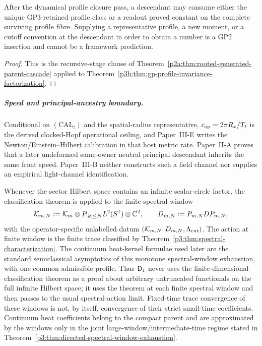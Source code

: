 \documentclass[12pt,a4paper]{article}
\begin{document}
\begin{corollary}
\label{p3b:cor:no-downstream-profile-insertion}
After the dynamical profile closure pass, a descendant may consume either the
unique GP3-retained profile class or a readout proved constant on the complete
surviving profile fibre.  Supplying a representative profile, a new moment,
or a cutoff convention at the descendant in order to obtain a number is a
GP2 insertion and cannot be a framework prediction.
\end{corollary}

\begin{proof}
This is the recursive-stage clause of
Theorem~\ref{p2a:thm:rooted-generated-parent-cascade} applied to
Theorem~\ref{p3b:thm:gp-profile-invariance-factorization}.
\end{proof}

\subparagraph{Speed and principal-ancestry boundary.}
Conditional on
\((\mathrm{CAL}_{t})\) and the spatial-radius representative,
\(c_{\rm op}=2\pi R_x/T_t\) is the derived clocked-Hopf operational ceiling,
and Paper~III-E writes the Newton/Einstein--Hilbert calibration in that host
metric rate.  Paper~II-A proves that a later undeformed same-owner neutral
principal descendant inherits the same front speed.  Paper~III-B neither
constructs such a field channel nor supplies an empirical light-channel
identification.

\begin{definition}
\label{p3:def:D1-finite-window}
Whenever the sector Hilbert space contains an infinite scalar-circle factor, the classification theorem is applied to the finite spectral window
\[
        \mathcal K_{m,N}:=\mathcal K_m\otimes P_{|k|\le N}L^2(S^1)\otimes\mathbb{C}^2,
        \qquad
        D_{m,N}:=P_{m,N}DP_{m,N},
\]
with the operator-specific unlabelled datum
\((\mathcal K_{m,N},D_{m,N},\Lambda_{\mathrm{cut}})\).  The action at finite window is the finite trace classified by Theorem~\ref{p3:thm:spectral-characterization}.  The continuum heat-kernel formulae used later are the standard semiclassical asymptotics of this monotone spectral-window exhaustion, with one common admissible profile.  Thus \(\mathsf{D}_1\) never uses the finite-dimensional classification theorem as a proof about arbitrary untruncated functionals on the full infinite Hilbert space; it uses the theorem at each finite spectral window and then passes to the usual spectral-action limit.
Fixed-time trace convergence of these windows is not, by itself, convergence
of their strict small-time coefficients.  Continuum heat coefficients belong
to the compact parent and are approximated by the windows only in the joint
large-window/intermediate-time regime stated in
Theorem~\ref{p3:thm:directed-spectral-window-exhaustion}.
\end{definition}
\end{document}
